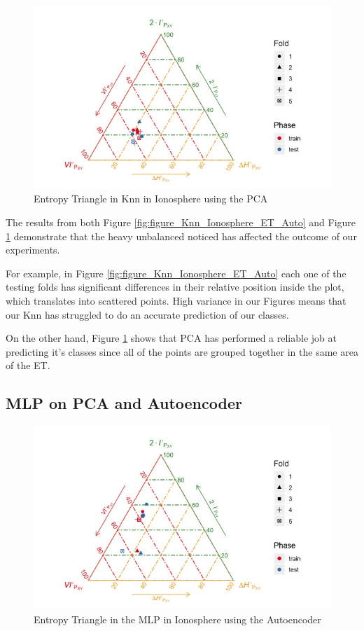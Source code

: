\begin{figure}[H]
	\centering
	\includegraphics[width=1\linewidth]{Figuras_tfg/ET_knn_Ionosphere_pca}
	\caption{Entropy Triangle in Knn in Ionosphere using the PCA}
	\label{fig:figure_Knn_Ionosphere_ET_PCA}
\end{figure}

The results from both Figure \ref{fig:figure_Knn_Ionosphere_ET_Auto} and Figure \ref{fig:figure_Knn_Ionosphere_ET_PCA} demonstrate that the heavy unbalanced noticed has affected the outcome of our experiments.\par
For example, in Figure \ref{fig:figure_Knn_Ionosphere_ET_Auto} each one of the testing folds has significant differences in their relative position inside the plot, which translates into scattered points. High variance in our Figures means that our Knn has struggled to do an accurate prediction of our classes.

On the other hand, Figure \ref{fig:figure_Knn_Ionosphere_ET_PCA} shows that PCA has performed a reliable job at predicting it's classes since all of the points are grouped together in the same area of the ET.

\subsection{MLP on PCA and Autoencoder}

\begin{figure}[H]
	\centering
	\includegraphics[width=1\linewidth]{Figuras_tfg/ET_mlp_Ionosphere_auto}
	\caption{Entropy Triangle in the MLP in Ionosphere using the Autoencoder}
	\label{fig:figure_MLP_Ionosphere_ET_Auto}
\end{figure}

